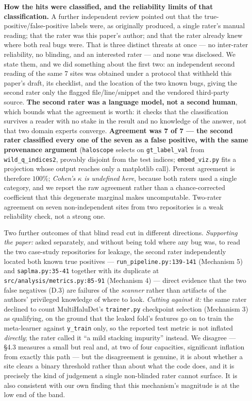 \documentclass[10pt]{article} %
\begin{document}
\textbf{How the hits were classified, and the reliability limits of that
classification.} A further independent review pointed out that the
true-positive/false-positive labels were, as originally produced, a single
rater's manual reading; that the rater was this paper's author; and that the
rater already knew where both real bugs were. That is three distinct threats at
once --- no inter-rater reliability, no blinding, and an interested rater ---
and none was disclosed. We state them, and we did something about the first
two: an independent second reading of the same 7 sites was obtained under a
protocol that withheld this paper's draft, its checklist, and the location of
the two known bugs, giving the second rater only the flagged
file/line/snippet and the vendored third-party source. \textbf{The second rater
was a language model, not a second human}, which bounds what the agreement is
worth: it checks that the classification survives a reader with no stake in the
result and no knowledge of the answer, not that two domain experts converge.
\textbf{Agreement was 7 of 7 --- the second rater classified every one of the
seven as a false positive, with the same provenance argument}
(\texttt{haloscope} selects on \texttt{gt\_label\_val} from
\texttt{wild\_q\_indices2}, provably disjoint from the test indices;
\texttt{embed\_viz.py} fits a projection whose output reaches only a matplotlib
call). Percent agreement is therefore $100\%$; \emph{Cohen's $\kappa$ is
undefined here}, because both raters used a single category, and we report the
raw agreement rather than a chance-corrected coefficient that this degenerate
marginal makes uncomputable. Two-rater agreement on seven non-independent sites
from two repositories is a weak reliability check, not a strong one.

Two further outcomes of that blind read cut in different directions.
\emph{Supporting the paper:} asked separately, and without being told where any
bug was, to read the two case-study repositories for leakage, the second rater
independently located both known true positives ---
\texttt{run\_pipeline.py:139-141} (Mechanism 5) and \texttt{saplma.py:35-41}
together with its duplicate at \texttt{src/analysis/metrics.py:85-91}
(Mechanism 4) --- direct evidence that the two false negatives (D.3) are failures of the \emph{scanner} rather than artifacts of the authors'
privileged knowledge of where to look. \emph{Cutting against it:} the same
rater declined to count MultiHaluDet's \texttt{trainer.py} checkpoint selection
(Mechanism 3) as qualifying, on the ground that the leaked fold's features go
on to train the meta-learner against \texttt{y\_train} only, so the reported
test metric is not inflated \emph{directly}; the rater called it ``a mild
stacking impurity'' instead. We disagree --- §4.3 measures a small but real
and, at two of four capacities, significant inflation from exactly this path
--- but the disagreement is genuine, it is about whether a site clears a binary
threshold rather than about what the code does, and it is precisely the kind of
judgement a single non-blinded rater cannot surface. It is also consistent with
our own finding that this mechanism's magnitude is at the low end of the band.
\end{document}
